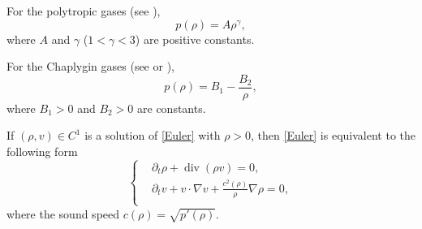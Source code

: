 \documentclass[11pt,twoside]{article}
\def\ds{\displaystyle}
\def\p{\partial}
\def\dive{\operatorname{div}}
\theoremstyle{plain}
\theoremstyle{definition}
\numberwithin{equation}{section}
\begin{document}
For the polytropic gases (see \cite{CF}),
\begin{equation}\label{polytropicGas}
    p(\rho)=A\rho^\gamma,
\end{equation}
where $A$ and $\gamma$ ($1<\gamma<3$) are positive constants.

For the Chaplygin gases (see \cite{CF} or \cite{Godin07}),
\begin{equation}\label{ChaplyginGas}
    p(\rho)=B_1-\frac{B_2}{\rho},
\end{equation}
where $B_1>0$ and $B_2>0$ are constants.

If $(\rho, v)\in C^1$ is a solution of \eqref{Euler} with $\rho>0$,
then \eqref{Euler} is equivalent to the following form
\begin{equation}\label{EulerC1form}
\left\{
\begin{aligned}
&\p_t\rho+\dive (\rho v)=0,\\
&\p_tv+v\cdot\nabla v+\ds\frac{c^2(\rho)}{\rho}\nabla \rho=0,\\
\end{aligned}
\right.
\end{equation}
where the sound speed $c(\rho)=\sqrt{p'(\rho)}$.
\end{document}
